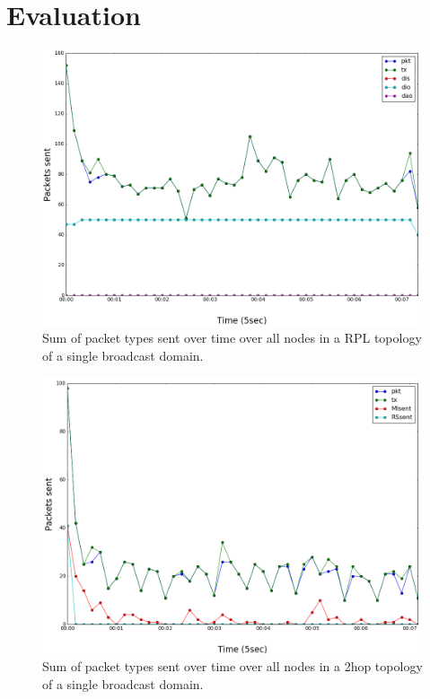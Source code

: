 \section{Evaluation} \label{section:evaluation}


\begin{figure}[t]
\centering
\includegraphics[width=\linewidth]{figs/rpl_single_hop.png}
\caption{Sum of packet types sent over time over all nodes in a RPL topology of a single broadcast domain.}
\label{fig:rpl_single_hop}
\end{figure}

\begin{figure}[t]
\centering
\includegraphics[width=\linewidth]{figs/3hop_single_hop.png}
\caption{Sum of packet types sent over time over all nodes in a 2hop topology of a single broadcast domain.}
\label{fig:3hop_single_hop}
\end{figure}

